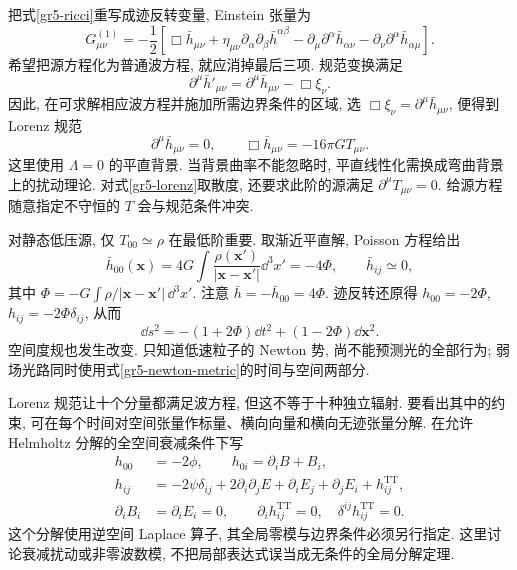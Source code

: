 把式\eqref{gr5-ricci}重写成迹反转变量, Einstein 张量为
\begin{equation}\label{gr5-einstein-linear}
 G^{(1)}_{\mu\nu}=-\frac12\left[
 \Box\bar h_{\mu\nu}+\eta_{\mu\nu}\partial_\alpha\partial_\beta\bar h^{\alpha\beta}
 -\partial_\mu\partial^\alpha\bar h_{\alpha\nu}
 -\partial_\nu\partial^\alpha\bar h_{\alpha\mu}\right].
\end{equation}
希望把源方程化为普通波方程, 就应消掉最后三项. 规范变换满足
\[
 \partial^\mu\bar h'_{\mu\nu}
 =\partial^\mu\bar h_{\mu\nu}-\Box\xi_\nu.
\]
因此, 在可求解相应波方程并施加所需边界条件的区域, 选 $\Box\xi_\nu=\partial^\mu\bar h_{\mu\nu}$, 便得到 Lorenz 规范
\begin{equation}\label{gr5-lorenz}
 \partial^\mu\bar h_{\mu\nu}=0,\qquad
 \Box\bar h_{\mu\nu}=-16\pi G T_{\mu\nu}.
\end{equation}
这里使用 $\Lambda=0$ 的平直背景. 当背景曲率不能忽略时, 平直线性化需换成弯曲背景上的扰动理论. 对式\eqref{gr5-lorenz}取散度, 还要求此阶的源满足 $\partial^\mu T_{\mu\nu}=0$. 给源方程随意指定不守恒的 $T$ 会与规范条件冲突.


对静态低压源, 仅 $T_{00}\simeq\rho$ 在最低阶重要. 取渐近平直解, Poisson 方程给出
\[
 \bar h_{00}(\boldsymbol x)=4G\int\frac{\rho(\boldsymbol x')}{|\boldsymbol x-\boldsymbol x'|}\dd^3x'
 =-4\Phi,\qquad \bar h_{ij}\simeq0,
\]
其中 $\Phi=-G\int\rho/|\boldsymbol x-\boldsymbol x'|\,\dd^3x'$. 注意 $\bar h= -\bar h_{00}=4\Phi$. 迹反转还原得 $h_{00}=-2\Phi$, $h_{ij}=-2\Phi\delta_{ij}$, 从而
\begin{equation}\label{gr5-newton-metric}
 \dd s^2=-(1+2\Phi)\dd t^2+(1-2\Phi)\dd\boldsymbol x^2.
\end{equation}
空间度规也发生改变. 只知道低速粒子的 Newton 势, 尚不能预测光的全部行为; 弱场光路同时使用式\eqref{gr5-newton-metric}的时间与空间两部分.

Lorenz 规范让十个分量都满足波方程, 但这不等于十种独立辐射. 要看出其中的约束, 可在每个时间对空间张量作标量、横向向量和横向无迹张量分解. 在允许 Helmholtz 分解的全空间衰减条件下写
\begin{align*}
 h_{00}&=-2\phi,\qquad h_{0i}=\partial_i B+B_i,\\
 h_{ij}&=-2\psi\delta_{ij}+2\partial_i\partial_j E
                 +\partial_i E_j+\partial_j E_i+h^{\mathrm{TT}}_{ij},\\
 \partial_i B_i&=\partial_i E_i=0,\qquad
 \partial_i h^{\mathrm{TT}}_{ij}=0,\quad \delta^{ij}h^{\mathrm{TT}}_{ij}=0.
\end{align*}
这个分解使用逆空间 Laplace 算子, 其全局零模与边界条件必须另行指定. 这里讨论衰减扰动或非零波数模, 不把局部表达式误当成无条件的全局分解定理.

